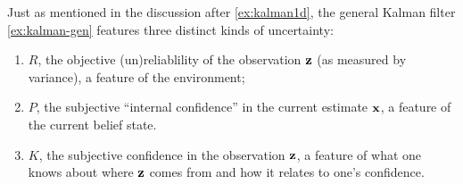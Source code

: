 \begin{subappendices}
    Just as mentioned in the discussion after \cref{ex:kalman1d}, 
    the general Kalman filter \cref{ex:kalman-gen} features
    three distinct kinds of uncertainty:
    \begin{enumerate}
    	\item $R$, the objective (un)reliablility of the observation $\mathbf z$
    		(as measured by variance), a feature of the environment;
    	\item $P$, the subjective ``internal confidence'' in the current
    	 	estimate $\mathbf x$, a feature of the current belief state.
    	\item $K$, the subjective confidence in the observation $\mathbf z$,
    		a feature of what one knows about where $\mathbf z$ comes from and
    		how it relates to one's confidence.
    \end{enumerate}

\end{subappendices}
